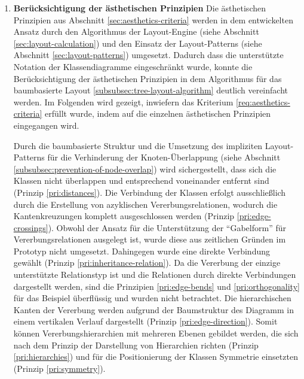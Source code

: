 \begin{enumerate}[label={K.\arabic*}]
\item
\label{eval:aesthetics-criteria}
\textbf{Berücksichtigung der ästhetischen Prinzipien}
Die ästhetischen Prinzipien aus Abschnitt \ref{sec:aesthetics-criteria} werden in dem entwickelten Ansatz durch den Algorithmus der Layout-Engine (siehe Abschnitt \ref{sec:layout-calculation}) und den Einsatz der Layout-Patterns (siehe Abschnitt \ref{sec:layout-patterns}) umgesetzt. Dadurch dass die unterstützte Notation der Klassendiagramme eingeschränkt wurde, konnte die Berücksichtigung der ästhetischen Prinzipien in dem Algorithmus für das baumbasierte Layout \ref{subsubsec:tree-layout-algorithm} deutlich vereinfacht werden. Im Folgenden wird gezeigt, inwiefern das Kriterium \ref{req:aesthetics-criteria} erfüllt wurde, indem auf die einzelnen ästhetischen Prinzipien eingegangen wird.

Durch die baumbasierte Struktur und die Umsetzung des impliziten Layout-Patterns für die Verhinderung der Knoten-Überlappung (siehe Abschnitt \ref{subsubsec:prevention-of-node-overlap}) wird sichergestellt, dass sich die Klassen nicht überlappen und entsprechend voneinander entfernt sind (Prinzip \ref{pri:distances}). Die Verbindung der Klassen erfolgt ausschließlich durch die Erstellung von azyklischen Vererbungsrelationen, wodurch die Kantenkreuzungen komplett ausgeschlossen werden (Prinzip \ref{pri:edge-crossings}). Obwohl der Ansatz für die Unterstützung der \enquote{Gabelform} für Vererbungsrelationen ausgelegt ist, wurde diese aus zeitlichen Gründen im Prototyp nicht umgesetzt. Dahingegen wurde eine direkte Verbindung gewählt (Prinzip \ref{pri:inheritance-relation}). Da die Vererbung der einzige unterstützte Relationstyp ist und die Relationen durch direkte Verbindungen dargestellt werden, sind die Prinzipien \ref{pri:edge-bends} und \ref{pri:orthogonality} für das Beispiel überflüssig und wurden nicht betrachtet. Die hierarchischen Kanten der Vererbung werden aufgrund der Baumstruktur des Diagramm in einem vertikalen Verlauf dargestellt (Prinzip \ref{pri:edge-direction}). Somit können Vererbungshierarchien mit mehreren Ebenen gebildet werden, die sich nach dem Prinzip der Darstellung von Hierarchien richten (Prinzip \ref{pri:hierarchies}) und für die Positionierung der Klassen Symmetrie einsetzten (Prinzip \ref{pri:symmetry}).


\end{enumerate}
